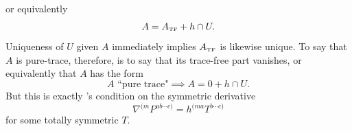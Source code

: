 \documentclass[11pt,letterpaper]{article}
\begin{document}
or equivalently \begin{equation}
A = A_{\mbox{\tiny{TF}}} + h \cap U.
\end{equation}
Uniqueness of $U$ given $A$ immediately implies $A_{\mbox{\tiny{TF}}}$ is likewise unique. To say that $A$ is pure-trace, therefore, is to say that its trace-free part vanishes, or equivalently that $A$ has the form \begin{equation}
A \mbox{ ``pure trace"} \implies A = 0 + h \cap U.
\end{equation}
But this is exactly \cite{Geroch:1970cc}'s condition on the symmetric derivative \begin{equation}
\nabla^{(m} P^{a b \cdots c)} = h^{(ma} T^{b \cdots c)}
\end{equation}
for some totally symmetric $T$.




\end{document}

